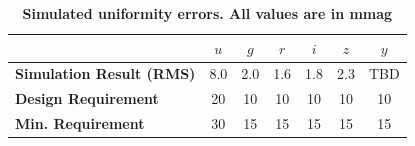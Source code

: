 \documentclass[12pt,preprint]{aastex}
\begin{document}
\begin{center}
\begin{table}[htb]
\caption{{\bf Simulated uniformity errors.  All values are in mmag} }
\begin{tabular}{l | c c c c c c }
 &   $u$  & $g$ & $r$ & $i$ & $z$ & $y$ \\ \hline
{\bf Simulation Result (RMS)}  & 8.0 & 2.0 & 1.6 & 1.8 & 2.3 & TBD \\ \hline
{\bf Design Requirement} &  20 & 10 & 10 & 10 & 10 & 10 \\ 
{\bf Min. Requirement} &  30 & 15 & 15 & 15 & 15 & 15 \\
\end{tabular}
\label{tab:uniform_error_budget}
\end{table}
\end{center}

\begin{figure}[htbp]
\centering
{}
\end{figure}
\end{document}
